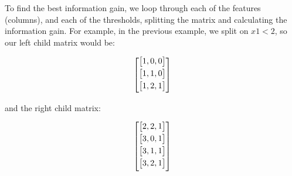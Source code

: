 \documentclass{article}
\begin{document}
To find the best information gain, we loop through each of the features (columns), and each of the thresholds, splitting the matrix and calculating the information gain. For example, in the previous example, we split on $x1<2$, so our left child matrix would be:
\begin{center}
\[
\begin{bmatrix}
\vspace{1mm}
\begin{bmatrix}
 1, 0, 0 \\
 \end{bmatrix} \\
\vspace{1mm}
 \begin{bmatrix}
 1,1,0 \\ 
 \end{bmatrix} \\
\vspace{1mm}
 \begin{bmatrix}
 1,2,1 \\ 
 \end{bmatrix} \\
 \end{bmatrix}
\]
\end{center}

and the right child matrix:

\begin{center}
\[
\begin{bmatrix}
\vspace{1mm}
 \begin{bmatrix}
 2,2,1 \\ 
 \end{bmatrix} \\
\vspace{1mm}
 \begin{bmatrix}
 3,0,1 \\
 \end{bmatrix} \\
\vspace{1mm}
 \begin{bmatrix}
 3,1,1 \\
 \end{bmatrix} \\
\vspace{1mm}
 \begin{bmatrix}
 3,2,1 \\
\end{bmatrix} \\
 \end{bmatrix}
\]
\end{center}
 
\end{document}
